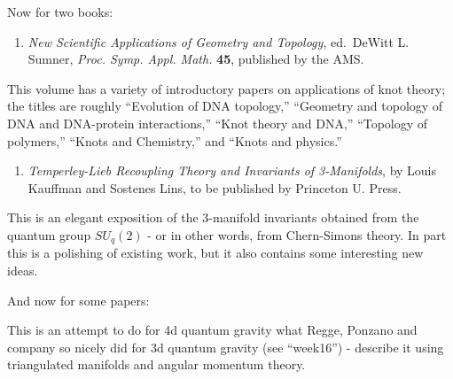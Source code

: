 \documentclass{article}
\def\tightlist{}
\renewcommand{\texttt}[1]{%
  \begingroup
  \ttfamily
  \begingroup\lccode`~=`/\lowercase{\endgroup\def~}{/\discretionary{}{}{}}%
  \begingroup\lccode`~=`[\lowercase{\endgroup\def~}{[\discretionary{}{}{}}%
  \begingroup\lccode`~=`.\lowercase{\endgroup\def~}{.\discretionary{}{}{}}%
  \catcode`/=\active\catcode`[=\active\catcode`.=\active
  \scantokens{#1\noexpand}%
  \endgroup
}
\begin{document}
Now for two books:

\begin{enumerate}
\def\labelenumi{\arabic{enumi})}
\setcounter{enumi}{1}
\tightlist
\item
  \emph{New Scientific Applications of Geometry and Topology},
  ed.~DeWitt L. Sumner, \emph{Proc. Symp. Appl. Math.} \textbf{45},
  published by the AMS.
\end{enumerate}

This volume has a variety of introductory papers on applications of knot
theory; the titles are roughly ``Evolution of DNA topology,'' ``Geometry
and topology of DNA and DNA-protein interactions,'' ``Knot theory and
DNA,'' ``Topology of polymers,'' ``Knots and Chemistry,'' and ``Knots
and physics.''

\begin{enumerate}
\def\labelenumi{\arabic{enumi})}
\setcounter{enumi}{2}
\tightlist
\item
  \emph{Temperley-Lieb Recoupling Theory and Invariants of 3-Manifolds},
  by Louis Kauffman and Sostenes Lins, to be published by Princeton U.
  Press.
\end{enumerate}

This is an elegant exposition of the 3-manifold invariants obtained from
the quantum group \(SU_q(2)\) - or in other words, from Chern-Simons
theory. In part this is a polishing of existing work, but it also
contains some interesting new ideas.

And now for some papers:


This is an attempt to do for 4d quantum gravity what Regge, Ponzano and
company so nicely did for 3d quantum gravity (see ``week16'') - describe
it using triangulated manifolds and angular momentum theory.

\end{document}
